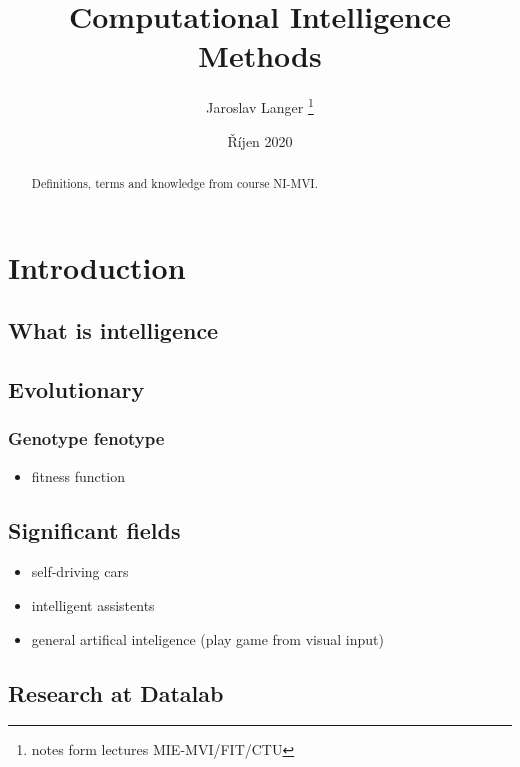 \documentclass[12pt, letterpaper]{article}
\title{Computational Intelligence Methods}
\author{Jaroslav Langer \thanks{notes form lectures MIE-MVI/FIT/CTU}}
\date{Říjen 2020}
\begin{document}
\maketitle

\tableofcontents

\begin{abstract}
Definitions, terms and knowledge from course NI-MVI. 
\end{abstract}

\section{Introduction}

\subsection*{}

\subsection*{What is intelligence}

\subsection*{Evolutionary}

\subsubsection*{Genotype fenotype}

\begin{itemize}
    \item fitness function
\end{itemize}

\subsection*{Significant fields}

\begin{itemize}
    \item self-driving cars
    \item intelligent assistents
    \item general artifical inteligence (play game from visual input)
\end{itemize}

\subsection*{Research at Datalab}
\end{document}
